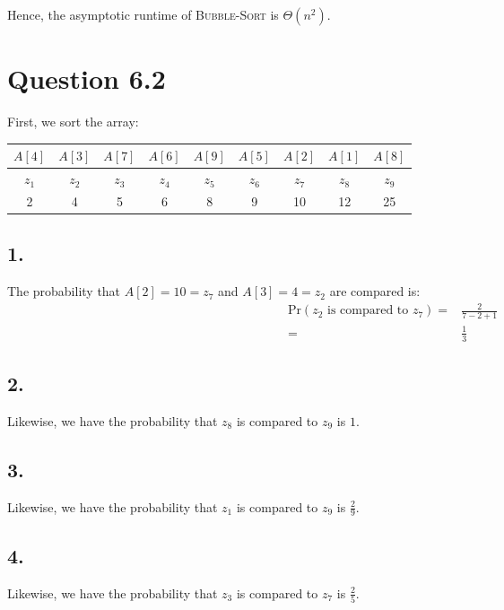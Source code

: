 \documentclass[a4paper,12pt]{article}
\begin{document}
Hence, the asymptotic runtime of \textsc{Bubble-Sort} is $\Theta(n^2)$.

\section*{Question 6.2}

First, we sort the array:

\begin{center}
	\begin{tabular}{|c|c|c|c|c|c|c|c|c|}
		\hline
		$A[4]$ & $A[3]$ & $A[7]$ & $A[6]$ & $A[9]$ & $A[5]$ & $A[2]$ & $A[1]$ & $A[8]$\\
		\hline
		$z_1$ & $z_2$ & $z_3$ & $z_4$ & $z_5$ & $z_6$ & $z_7$ & $z_8$ & $z_9$\\
		\hline
		2 & 4 & 5 & 6 & 8 & 9 & 10 & 12 & 25\\
		\hline
	\end{tabular}
\end{center}

\subsection*{1.}

The probability that $A[2]=10=z_7$ and $A[3]=4=z_2$ are compared is:
\begin{align*}
	\text{Pr}(\text{$z_2$ is compared to $z_7$}) =& \frac{2}{7-2+1}\\
	=& \frac{1}{3} 
\end{align*}

\subsection*{2.}

Likewise, we have the probability that $z_8$ is compared to $z_9$ is $1$.

\subsection*{3.}

Likewise, we have the probability that $z_1$ is compared to $z_9$ is $\frac{2}{9}$.

\subsection*{4.}

Likewise, we have the probability that $z_3$ is compared to $z_7$ is $\frac{2}{5}$.
\end{document}
